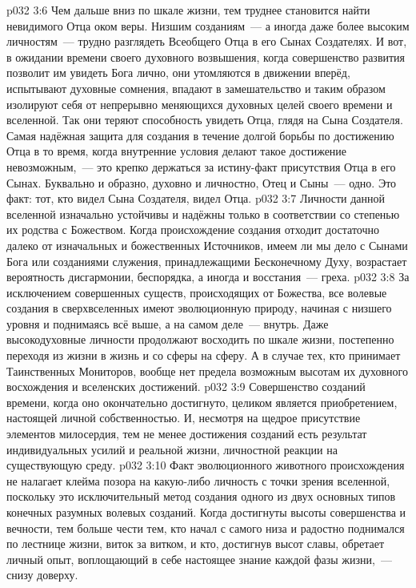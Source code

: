 \vs p032 3:6 Чем дальше вниз по шкале жизни, тем труднее становится найти невидимого Отца оком веры. Низшим созданиям~--- а иногда даже более высоким личностям~--- трудно разглядеть Всеобщего Отца в его Сынах Создателях. И вот, в ожидании времени своего духовного возвышения, когда совершенство развития позволит им увидеть Бога лично, они утомляются в движении вперёд, испытывают духовные сомнения, впадают в замешательство и таким образом изолируют себя от непрерывно меняющихся духовных целей своего времени и вселенной. Так они теряют способность увидеть Отца, глядя на Сына Создателя. Самая надёжная защита для создания в течение долгой борьбы по достижению Отца в то время, когда внутренние условия делают такое достижение невозможным,~--- это крепко держаться за истину\hyp{}факт присутствия Отца в его Сынах. Буквально и образно, духовно и личностно, Отец и Сыны~--- одно. Это факт: тот, кто видел Сына Создателя, видел Отца.
\vs p032 3:7 \pc Личности данной вселенной изначально устойчивы и надёжны только в соответствии со степенью их родства с Божеством. Когда происхождение создания отходит достаточно далеко от изначальных и божественных Источников, имеем ли мы дело с Сынами Бога или созданиями служения, принадлежащими Бесконечному Духу, возрастает вероятность дисгармонии, беспорядка, а иногда и восстания~--- греха.
\vs p032 3:8 \pc За исключением совершенных существ, происходящих от Божества, все волевые создания в сверхвселенных имеют эволюционную природу, начиная с низшего уровня и поднимаясь всё выше, а на самом деле~--- внутрь. Даже высокодуховные личности продолжают восходить по шкале жизни, постепенно переходя из жизни в жизнь и со сферы на сферу. А в случае тех, кто принимает Таинственных Мониторов, вообще нет предела возможным высотам их духовного восхождения и вселенских достижений.
\vs p032 3:9 Совершенство созданий времени, когда оно окончательно достигнуто, целиком является приобретением, настоящей личной собственностью. И, несмотря на щедрое присутствие элементов милосердия, тем не менее достижения созданий есть результат индивидуальных усилий и реальной жизни, личностной реакции на существующую среду.
\vs p032 3:10 Факт эволюционного животного происхождения не налагает клейма позора на какую\hyp{}либо личность с точки зрения вселенной, поскольку это исключительный метод создания одного из двух основных типов конечных разумных волевых созданий. Когда достигнуты высоты совершенства и вечности, тем больше чести тем, кто начал с самого низа и радостно поднимался по лестнице жизни, виток за витком, и кто, достигнув высот славы, обретает личный опыт, воплощающий в себе настоящее знание каждой фазы жизни,~--- снизу доверху.

